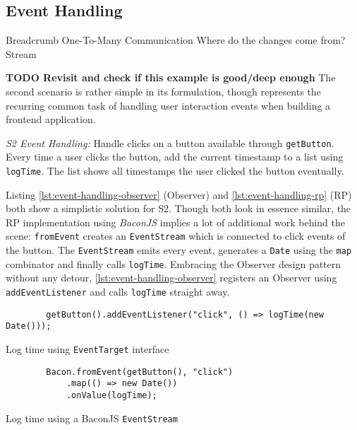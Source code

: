 \documentclass[12pt,a4paper]{article}
\begin{document}
\subsection{Event Handling}

Breadcrumb
One-To-Many Communication
Where do the changes come from?
	Stream



\textbf{TODO Revisit and check if this example is good/deep enough} The second scenario is rather simple in its formulation, though represents the recurring common task of handling user interaction events when building a frontend application.

\begin{framed}
	\noindent\emph{S2 Event Handling:} Handle clicks on a button available through \texttt{getButton}. Every time a user clicks the button, add the current timestamp to a list using \texttt{logTime}. The list shows all timestamps the user clicked the button eventually.
\end{framed}

Listing \ref{lst:event-handling-observer} (Observer) and \ref{lst:event-handling-rp} (RP) both show a simplistic solution for S2. Though both look in essence similar, the RP implementation using \emph{BaconJS} implies a lot of additional work behind the scene: \texttt{fromEvent} creates an \texttt{EventStream} which is connected to click events of the button. The \texttt{EventStream} emits every event, generates a \texttt{Date} using the \texttt{map} combinator and finally calls \texttt{logTime}. Embracing the Observer design pattern without any detour, \ref{lst:event-handling-observer} registers an Observer using \texttt{addEventListener} and calls \texttt{logTime} straight away.

\begin{listing}[H]
	\begin{verbatim}
		getButton().addEventListener("click", () => logTime(new Date()));
	\end{verbatim}
	\caption{Log time using \texttt{EventTarget} interface}
	\label{lst:event-handling-observer}
\end{listing}

\begin{listing}[H]
	\begin{verbatim}
		Bacon.fromEvent(getButton(), "click")
			.map(() => new Date())
			.onValue(logTime);
	\end{verbatim}
	\caption{Log time using a BaconJS \texttt{EventStream}}
	\label{lst:event-handling-rp}
\end{listing}
\end{document}
